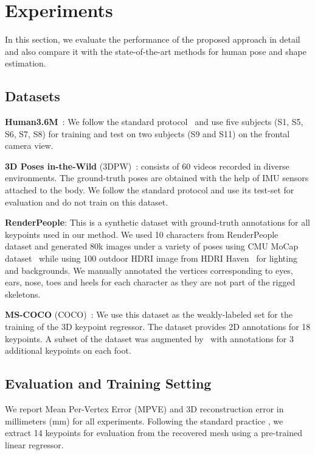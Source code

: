\section{Experiments}
In this section, we evaluate the performance of the proposed approach in detail and also compare it with the state-of-the-art methods for human pose and shape estimation. 

\subsection{Datasets}
\noindent\textbf{Human3.6M}~\cite{h36m_pami}: We follow the standard protocol~\cite{hmrKanazawa18} and use five subjects (S1, S5, S6, S7, S8) for training and test on two subjects (S9 and S11) on the frontal camera view. 

\noindent\textbf{3D Poses in-the-Wild} (3DPW)~\cite{vonMarcard2018}: consists of 60 videos recorded in diverse environments. The ground-truth poses are obtained with the help of IMU sensors attached to the body. We follow the standard protocol and use its test-set for evaluation and do not train on this dataset. 

\noindent\textbf{RenderPeople}: This is a synthetic dataset with ground-truth annotations for all  keypoints used in our method.  We used 10 characters from RenderPeople~\cite{renderpeople} dataset and generated 80k images under a variety of poses using CMU MoCap dataset~\cite{cmu_mocap} while using 100 outdoor HDRI image from HDRI Haven~\cite{hdrihaven} for lighting and backgrounds. We manually annotated the vertices corresponding to eyes, ears, nose, toes and heels for each character as they are not part of the rigged skeletons.

\noindent\textbf{MS-COCO} (COCO)~\cite{lin2014microsoft}: We use this dataset as the weakly-labeled set for the training of the 3D keypoint regressor. The dataset provides 2D annotations for 18 keypoints. A subset of the dataset was augmented by~\cite{cao2019openpose} with annotations for 3 additional keypoints on each foot. 

\subsection{Evaluation and Training Setting} We report Mean Per-Vertex Error (MPVE) and 3D reconstruction error in millimeters (mm) for all experiments. Following the standard practice \cite{hmrKanazawa18}, we extract 14 keypoints for evaluation from the recovered mesh using a pre-trained linear regressor.  

